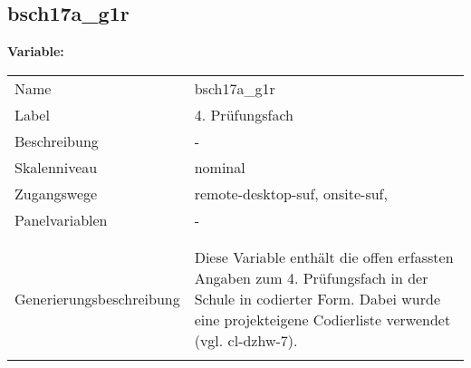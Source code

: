 	
	
	\subsection{bsch17a\_g1r}
	\label{subSection:bsch17a_g1r}

	\noindent\textbf{Variable:}\\
		\begin{tabular}{lL{11.3cm}}
			\label{tableVariable:bsch17a_g1r}
			Name & bsch17a\_g1r \\
			Label & 4. Prüfungsfach   \\
			Beschreibung & - \\
			Skalenniveau & nominal \\
			Zugangswege &
				remote-desktop-suf,
				onsite-suf,
 \\
			Panelvariablen & -
			 \\
			 \\
 \\
					Generierungsbeschreibung & Diese Variable enthält die offen erfassten Angaben zum 4. Prüfungsfach in der Schule in codierter Form. Dabei wurde eine projekteigene Codierliste verwendet (vgl. cl-dzhw-7).
				 \\	
			 \\
		\end{tabular}






